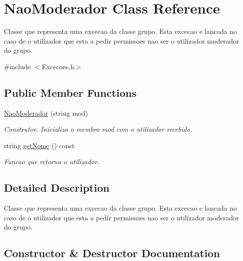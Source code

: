 \hypertarget{class_nao_moderador}{}\section{Nao\+Moderador Class Reference}
\label{class_nao_moderador}


Classe que representa uma excecao da classe grupo. Esta excecao e lancada no caso de o utilizador que esta a pedir permissoes nao ser o utilizador moderador do grupo.  




{\ttfamily \#include $<$Excecoes.\+h$>$}

\subsection*{Public Member Functions}
\begin{DoxyCompactItemize}
\item 
\hyperlink{class_nao_moderador_aa57843875543c5246fc733f87b6ef3dd}{Nao\+Moderador} (string mod)
\begin{DoxyCompactList}\small\item\em Construtor. Inicializa o membro mod com o utilizador recebido. \end{DoxyCompactList}\item 
string \hyperlink{class_nao_moderador_aff0ecf62b3446554d93d4032276a6f29}{get\+Nome} () const 
\begin{DoxyCompactList}\small\item\em Funcao que retorna o utilizador. \end{DoxyCompactList}\end{DoxyCompactItemize}


\subsection{Detailed Description}
Classe que representa uma excecao da classe grupo. Esta excecao e lancada no caso de o utilizador que esta a pedir permissoes nao ser o utilizador moderador do grupo. 

\subsection{Constructor \& Destructor Documentation}
\hypertarget{class_nao_moderador_aa57843875543c5246fc733f87b6ef3dd}{}
